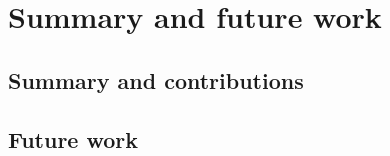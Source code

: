 
\chapter{Summary and future work}
\label{summaryandfuturework}


\section{Summary and contributions}
\label{summaryandfuturework.summary}


\section{Future work}
\label{summaryandfuturework.futurework}


